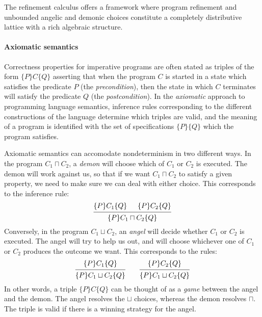 \documentclass[format=sigplan,authordraft]{acmart}
\newcommand{\htr}[3]{{ \{{#1}\} {#2} \{{#3}\} }}
\begin{document}
The refinement calculus offers a framework
where program refinement and
unbounded angelic and demonic choices
constitute a completely distributive lattice
with a rich algebraic structure.

\paragraph{Axiomatic semantics} %

Correctness properties for imperative programs
are often stated as triples of the form $\{P\} C \{Q\}$
asserting that
when the program $C$ is started in a state which
satisfies the predicate $P$ (the \emph{precondition}),
then the state in which $C$ terminates
will satisfy the predicate $Q$ (the \emph{postcondition}).
In the \emph{axiomatic} approach to programming language semantics,
inference rules
corresponding to the different constructions of the language
determine which triples are valid,
and the meaning of a program is identified with
the set of specifications $\{P\}\{Q\}$
which the program satisfies.

Axiomatic semantics
can accomodate nondeterminism in two different ways.
In the program $C_1 \sqcap C_2$,
a \emph{demon} will choose which of $C_1$ or $C_2$ is executed.
The demon will work against us,
so that if we want $C_1 \sqcap C_2$ to satisfy a given property,
we need to make sure we can deal with either choice.
This corresponds to the inference rule:
\[
  \begin{prooftree}
    \hypo{\htr{P}{C_1}{Q}}
    \hypo{\htr{P}{C_2}{Q}}
    \infer2{\htr{P}{C_1 \sqcap C_2}{Q}}
  \end{prooftree}
\]
Conversely,
in the program $C_1 \sqcup C_2$,
an \emph{angel} will decide whether $C_1$ or $C_2$ is executed.
The angel will try to help us out,
and will choose whichever one of $C_1$ or $C_2$ produces
the outcome we want.
This corresponds to the rules:
\[
  \begin{prooftree}
    \hypo{\{P\} C_1 \{Q\}}
    \infer1{\{P\} C_1 \sqcup C_2 \{Q\}}
  \end{prooftree}
  \qquad
  \begin{prooftree}
    \hypo{\{P\} C_2 \{Q\}}
    \infer1{\{P\} C_1 \sqcup C_2 \{Q\}}
  \end{prooftree}
\]
In other words,
a triple $\htr{P}{C}{Q}$
can be thought of as a \emph{game}
between the angel and the demon.
The angel resolves the $\sqcup$ choices,
whereas the demon resolves $\sqcap$.
The triple is valid if there is a winning strategy
for the angel.
\end{document}
